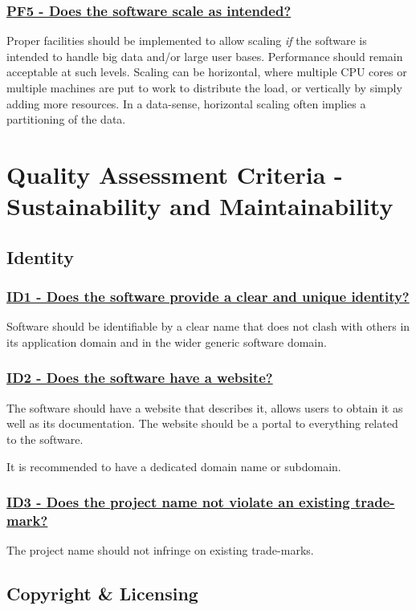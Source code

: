 \documentclass[a4paper,11pt]{article}
\newcommand{\criterion}[2]{\subsubsection*{\underline{#1 - #2}}\label{id:#1}}
\newcommand\CheckTable{%
  \begin{tabular}{ccccc}
    No & Minimal & Adequate & Good & Perfect \\
    0 & 1 & 2 & 3 & 4 \\
    \hline
    $\square$ & $\square$ & $\square$ & $\square$ & $\square$ \\
  \end{tabular}%
}
\begin{document}

\newcommand{\pfFiveID}{PF5}
\newcommand{\pfFiveText}{Does the software scale as intended?}
\criterion{\pfFiveID}{\pfFiveText}

Proper facilities should be implemented to allow scaling \emph{if} the software is
intended to handle big data and/or large user bases. Performance should remain
acceptable at such levels.  Scaling can be horizontal, where multiple CPU cores
or multiple machines are put to work to distribute the load, or vertically by
simply adding more resources. In a data-sense, horizontal scaling often implies
a partitioning of the data.


\section{Quality Assessment Criteria - Sustainability and Maintainability}\label{sec:sustAndMaint}

\subsection{Identity}\label{sec:ide}

\newcommand{\idOneID}{ID1}
\newcommand{\idOneText}{Does the software provide a clear and unique identity?}
\criterion{\idOneID}{\idOneText}

Software should be identifiable by a clear name that does not clash with others
in its application domain and in the wider generic software domain. 


\newcommand{\idTwoID}{ID2}
\newcommand{\idTwoText}{Does the software have a website?}
\criterion{\idTwoID}{\idTwoText}

The software should have a website that describes it, allows users to obtain
it as well as its documentation. The website should be a portal to everything
related to the software.

It is recommended to have a dedicated domain name or subdomain.


\newcommand{\idThreeID}{ID3}
\newcommand{\idThreeText}{Does the project name not violate an existing trade-mark?}
\criterion{\idThreeID}{\idThreeText}

The project name should not infringe on existing trade-marks.


\subsection{Copyright \& Licensing}\label{sec:cop}
\end{document}
